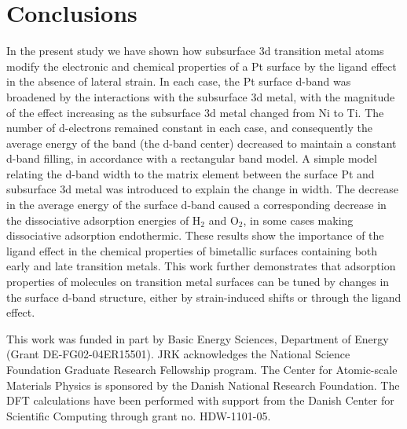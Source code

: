 \documentclass[aps,preprint,superscriptaddress,endfloats*]{revtex4}
\begin{document}
\section{Conclusions}
In the present study we have shown how subsurface 3d transition metal
atoms modify the electronic and chemical properties of a Pt surface by
the ligand effect in the absence of lateral strain.  In each case, the
Pt surface d-band was broadened by the interactions with the
subsurface 3d metal, with the magnitude of the effect increasing as
the subsurface 3d metal changed from Ni to Ti. The number of
d-electrons remained constant in each case, and consequently the
average energy of the band (the d-band center) decreased to maintain a
constant d-band filling, in accordance with a rectangular band model.
A simple model relating the d-band width to the matrix element between
the surface Pt and subsurface 3d metal was introduced to explain the
change in width.  The decrease in the average energy of the surface
d-band caused a corresponding decrease in the dissociative adsorption
energies of H$_2$ and O$_2$, in some cases making dissociative
adsorption endothermic.  These results show the importance of the
ligand effect in the chemical properties of bimetallic surfaces
containing both early and late transition metals.  This work further
demonstrates that adsorption properties of molecules on transition
metal surfaces can be tuned by changes in the surface d-band
structure, either by strain-induced shifts or through the ligand
effect.

 
\begin{acknowledgments}
This work was funded in part by Basic Energy Sciences, Department of
Energy (Grant DE-FG02-04ER15501).  JRK acknowledges the National
Science Foundation Graduate Research Fellowship program.  The Center
for Atomic-scale Materials Physics is sponsored by the Danish National
Research Foundation. The DFT calculations have been performed with
support from the Danish Center for Scientific Computing through grant
no. HDW-1101-05.
\end{acknowledgments}


\end{document}
